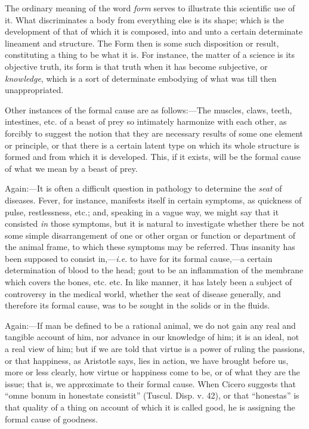 The ordinary meaning of the word \emph{form} serves to illustrate
this scientific use of it. What discriminates a body from everything
else is its shape; which is the development of that of which it is
composed, into and unto a certain determinate lineament and structure.
The Form then is some such disposition or result, constituting a thing
to be what it is. For instance, the matter of a science is its
objective truth, its form is that truth when it has become subjective,
or \emph{knowledge}, which is a sort of determinate embodying of what
was till then unappropriated.

Other instances of the formal cause are as follows:—The muscles,
claws, teeth, intestines, etc. of a beast of prey so intimately
harmonize with each other, as forcibly to suggest the notion that they
are necessary results of some one element or principle, or that there
is a certain latent type on which its whole structure is formed and
from which it is developed. This, if it exists, will be the formal
cause of what we mean by a beast of prey.

Again:—It is often a difficult question in pathology to determine
the \emph{seat} of diseases. Fever, for instance, manifests itself in
certain symptoms, as quickness of pulse, restlessness, etc.; and,
speaking in a vague way, we might say that it consisted \emph{in}
those symptoms, but it is natural to investigate whether there be not
some simple disarrangement of one or other organ or function or
department of the animal frame, to which these symptoms may be
referred. Thus insanity has been supposed to consist in,—\emph{i.e}.
to have for its formal cause,—a certain determination of blood to
the head; gout to be an inflammation of the membrane which covers the
bones, etc. etc. In like manner, it has lately been a subject of
controversy in the medical world, whether the seat of disease
generally, and therefore its formal cause, was to be sought in the
solids or in the fluids.

Again:—If man be defined to be a rational animal, we do not gain
any real and tangible account of him, nor advance in our knowledge of
him; it is an ideal, not a real view of him; but if we are told that
virtue is a power of ruling the passions, or that happiness, as
Aristotle says, lies in action, we have brought before us, more or
less clearly, how virtue or happiness come to be, or of what they are
the issue; that is, we approximate to their formal cause. When Cicero
suggests that ``omne bonum in honestate consistit'' (Tuscul.
Disp. v. 42), or that ``honestas'' is that quality of a thing
on account of which it is called good, he is assigning the formal
cause of goodness.

